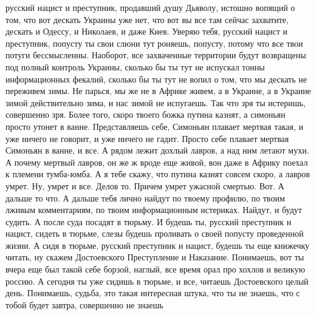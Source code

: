 русский нацист и преступник, продавший душу Дьяволу, истошно вопящий о том, 
что вот дескать Украины уже нет, что вот вы все там сейчас захватите,
дескать и Одессу, и Николаев, и даже Киев. Уверяю тебя, русский нацист и преступник,
попусту ты свои слюни тут роняешь, попусту, потому что все твои потуги бессмысленны.
Наоборот, все захваченные территории будут возвращены под полный контроль Украины,
сколько бы ты тут не испускал тонны информационных фекалий, сколько бы ты тут не вопил о том,
что мы дескать не переживем зимы. Не парься, мы же не в Африке живем, а в Украине,
а в Украине зимой действительно зима, и нас зимой не испугаешь. Так что зря ты истеришь,
совершенно зря. Более того, скоро твоего божка путина казнят, а симоньян просто утонет в ванне.
Представляешь себе, Симоньян плавает мертвая такая, и уже ничего не говорит,
и уже ничего не гадит. Просто себе плавает мертвая Симоньян в ванне, и все. А рядом лежит
дохлый лавров, а над ним летают мухи. А почему мертвый лавров, он же ж вроде
еще живой, вон даже в Африку поехал к племени тумба-юмба. А я тебе скажу, что путина казнят совсем скоро,
а лавров умрет. Ну, умрет и все. Делов то. Причем умрет ужасной смертью. Вот. А дальше то что.
А дальше тебя лично найдут по твоему профилю, по твоим лживым комментариям, по твоим
информационным истериках. Найдут, и будут судить. А после суда посадят в тюрьму. И будешь ты,
русский преступник и нацист, сидеть в тюрьме, слезы будешь проливать о своей попусту проведенной жизни.
А сидя в тюрьме, русский преступник и нацист, будешь ты еще книжечку читать, ну скажем Достоевского
Преступление и Наказание. Понимаешь, вот ты вчера еще был такой себе борзой, наглый, все время орал
про хохлов и великую россию. А сегодня ты уже сидишь в тюрьме, и все, читаешь Достоевского целый день.
Понимаешь, судьба, это такая интересная штука, что ты не знаешь, что с тобой будет завтра, совершенно 
не знаешь

